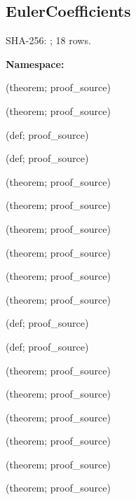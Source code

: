 \subsection*{EulerCoefficients}
{\footnotesize SHA-256: ; 18 rows.}\par
\begingroup\small
\textbf{Namespace:} \par
\noindent{} {\scriptsize (theorem; proof\_source)}\par
\noindent{} {\scriptsize (theorem; proof\_source)}\par
\noindent{} {\scriptsize (def; proof\_source)}\par
\noindent{} {\scriptsize (def; proof\_source)}\par
\noindent{} {\scriptsize (theorem; proof\_source)}\par
\noindent{} {\scriptsize (theorem; proof\_source)}\par
\noindent{} {\scriptsize (theorem; proof\_source)}\par
\noindent{} {\scriptsize (theorem; proof\_source)}\par
\noindent{} {\scriptsize (theorem; proof\_source)}\par
\noindent{} {\scriptsize (theorem; proof\_source)}\par
\noindent{} {\scriptsize (def; proof\_source)}\par
\noindent{} {\scriptsize (def; proof\_source)}\par
\noindent{} {\scriptsize (theorem; proof\_source)}\par
\noindent{} {\scriptsize (theorem; proof\_source)}\par
\noindent{} {\scriptsize (theorem; proof\_source)}\par
\noindent{} {\scriptsize (theorem; proof\_source)}\par
\noindent{} {\scriptsize (theorem; proof\_source)}\par
\noindent{} {\scriptsize (theorem; proof\_source)}\par
\endgroup
